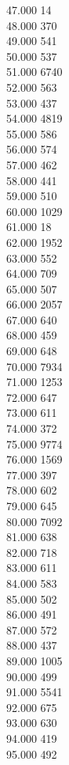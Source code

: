 { 47.000	14 \\
 48.000	370 \\
 49.000	541 \\
 50.000	537 \\
 51.000	6740 \\
 52.000	563 \\
 53.000	437 \\
 54.000	4819 \\
 55.000	586 \\
 56.000	574 \\
 57.000	462 \\
 58.000	441 \\
 59.000	510 \\
 60.000	1029 \\
 61.000	18 \\
 62.000	1952 \\
 63.000	552 \\
 64.000	709 \\
 65.000	507 \\
 66.000	2057 \\
 67.000	640 \\
 68.000	459 \\
 69.000	648 \\
 70.000	7934 \\
 71.000	1253 \\
 72.000	647 \\
 73.000	611 \\
 74.000	372 \\
 75.000	9774 \\
 76.000	1569 \\
 77.000	397 \\
 78.000	602 \\
 79.000	645 \\
 80.000	7092 \\
 81.000	638 \\
 82.000	718 \\
 83.000	611 \\
 84.000	583 \\
 85.000	502 \\
 86.000	491 \\
 87.000	572 \\
 88.000	437 \\
 89.000	1005 \\
 90.000	499 \\
 91.000	5541 \\
 92.000	675 \\
 93.000	630 \\
 94.000	419 \\
 95.000	492 \\
}

